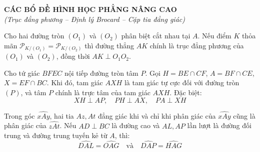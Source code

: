 \documentclass[12pt,a4paper]{article}
\begin{document}
\begin{center}
	{\Large \textbf{CÁC BỔ ĐỀ HÌNH HỌC PHẲNG NÂNG CAO}}\\[2mm]
	{\small \textit{(Trục đẳng phương -- Định lý Brocard -- Cặp tia đẳng giác)}}
\end{center}
\vspace{4mm}

\begin{tcolorbox}[colback=blue!5!white,colframe=blue!75!black,title=\textbf{Bổ đề 1: Trục đẳng phương vuông góc với Đường nối tâm}]
Cho hai đường tròn $(O_1)$ và $(O_2)$ phân biệt cắt nhau tại $A$. Nếu điểm $K$ thỏa mãn $\mathcal{P}_{K/(O_1)} = \mathcal{P}_{K/(O_2)}$ thì đường thẳng $AK$ chính là trục đẳng phương của $(O_1)$ và $(O_2)$, đồng thời $AK \perp O_1 O_2$.
\end{tcolorbox}

\vspace{3mm}

\begin{tcolorbox}[colback=teal!5!white,colframe=teal!75!black,title=\textbf{Bổ đề 2: Định lý Brocard cho Tứ giác nội tiếp}]
Cho tứ giác $BFEC$ nội tiếp đường tròn tâm $P$. Gọi $H = BE \cap CF$, $A = BF \cap CE$, $X = EF \cap BC$. Khi đó, tam giác $AXH$ là tam giác tự cực đối với đường tròn $(P)$, và tâm $P$ chính là trực tâm của tam giác $AXH$. Đặc biệt:
\[
XH \perp AP, \quad PH \perp AX, \quad PA \perp XH
\]
\end{tcolorbox}

\vspace{3mm}

\begin{tcolorbox}[colback=orange!5!white,colframe=orange!75!black,title=\textbf{Bổ đề 3: Cặp tia đẳng giác và Tỉ số Tangent}]
Trong góc $\widehat{xAy}$, hai tia $Az, At$ đẳng giác khi và chỉ khi phân giác của $\widehat{xAy}$ cũng là phân giác của $\widehat{zAt}$. Nếu $AD \perp BC$ là đường cao và $AL, AP$ lần lượt là đường đối trung và đường trung tuyến kẻ từ $A$, thì:
\[
\widehat{DAL} = \widehat{OAG} \quad \text{và} \quad \widehat{DAP} = \widehat{HAG}
\]
\end{tcolorbox}
\end{document}
